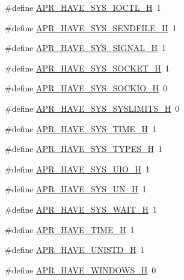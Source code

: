 \begin{DoxyCompactItemize}
\item 
\#define \hyperlink{group__apr__platform_gaa770dc014bd3652af53e0b5007bacbba}{A\+P\+R\+\_\+\+H\+A\+V\+E\+\_\+\+S\+Y\+S\+\_\+\+I\+O\+C\+T\+L\+\_\+H}~1
\item 
\#define \hyperlink{group__apr__platform_gadad28590d1ed5f6417d364da8d224c32}{A\+P\+R\+\_\+\+H\+A\+V\+E\+\_\+\+S\+Y\+S\+\_\+\+S\+E\+N\+D\+F\+I\+L\+E\+\_\+H}~1
\item 
\#define \hyperlink{group__apr__platform_ga8fcdcf3453badd12e7690ef1d3633524}{A\+P\+R\+\_\+\+H\+A\+V\+E\+\_\+\+S\+Y\+S\+\_\+\+S\+I\+G\+N\+A\+L\+\_\+H}~1
\item 
\#define \hyperlink{group__apr__platform_ga355cce8fb6a675d1608a249e80943cd1}{A\+P\+R\+\_\+\+H\+A\+V\+E\+\_\+\+S\+Y\+S\+\_\+\+S\+O\+C\+K\+E\+T\+\_\+H}~1
\item 
\#define \hyperlink{group__apr__platform_ga66930e9c37ff249fac4f04660e0b4658}{A\+P\+R\+\_\+\+H\+A\+V\+E\+\_\+\+S\+Y\+S\+\_\+\+S\+O\+C\+K\+I\+O\+\_\+H}~0
\item 
\#define \hyperlink{group__apr__platform_ga5f63518e601ff8db2435aac44aa1f5f1}{A\+P\+R\+\_\+\+H\+A\+V\+E\+\_\+\+S\+Y\+S\+\_\+\+S\+Y\+S\+L\+I\+M\+I\+T\+S\+\_\+H}~0
\item 
\#define \hyperlink{group__apr__platform_ga9c3c283b26dc4a611e0e90586940d988}{A\+P\+R\+\_\+\+H\+A\+V\+E\+\_\+\+S\+Y\+S\+\_\+\+T\+I\+M\+E\+\_\+H}~1
\item 
\#define \hyperlink{group__apr__platform_gad364bcfd0d4403388881ae74f30ae870}{A\+P\+R\+\_\+\+H\+A\+V\+E\+\_\+\+S\+Y\+S\+\_\+\+T\+Y\+P\+E\+S\+\_\+H}~1
\item 
\#define \hyperlink{group__apr__platform_gabaeaf82b82e76979dfbe64a43e02b23f}{A\+P\+R\+\_\+\+H\+A\+V\+E\+\_\+\+S\+Y\+S\+\_\+\+U\+I\+O\+\_\+H}~1
\item 
\#define \hyperlink{group__apr__platform_ga342802d31427d75aa8d9508fc42862f1}{A\+P\+R\+\_\+\+H\+A\+V\+E\+\_\+\+S\+Y\+S\+\_\+\+U\+N\+\_\+H}~1
\item 
\#define \hyperlink{group__apr__platform_ga4358584279b9bef5e9befef3e70be3a0}{A\+P\+R\+\_\+\+H\+A\+V\+E\+\_\+\+S\+Y\+S\+\_\+\+W\+A\+I\+T\+\_\+H}~1
\item 
\#define \hyperlink{group__apr__platform_gad8de7d46efa8bf6404fcb105cb9fec66}{A\+P\+R\+\_\+\+H\+A\+V\+E\+\_\+\+T\+I\+M\+E\+\_\+H}~1
\item 
\#define \hyperlink{group__apr__platform_ga5027a53811b56363639e832027752456}{A\+P\+R\+\_\+\+H\+A\+V\+E\+\_\+\+U\+N\+I\+S\+T\+D\+\_\+H}~1
\item 
\#define \hyperlink{group__apr__platform_ga129087a39c180d855be6585c9efe2ff2}{A\+P\+R\+\_\+\+H\+A\+V\+E\+\_\+\+W\+I\+N\+D\+O\+W\+S\+\_\+H}~0

\end{DoxyCompactItemize}
